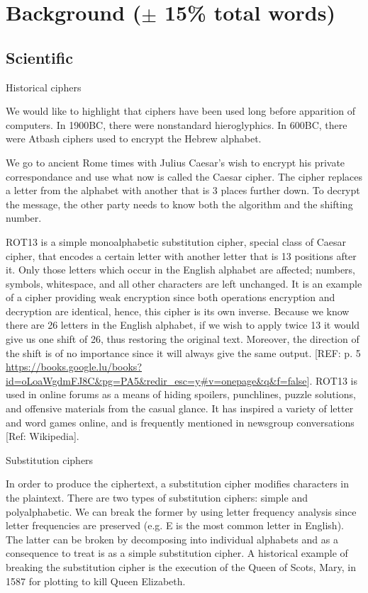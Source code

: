 \section{Background ($\pm$ 15\% total words)}
\subsection{Scientific}

Historical ciphers

We would like to highlight that ciphers have been used long before apparition of computers. In 1900BC, there were nonstandard hieroglyphics. In 600BC, there were Atbash ciphers used to encrypt the Hebrew alphabet. 

We go to ancient Rome times with Julius Caesar's wish to encrypt his private correspondance and use what now is called the Caesar cipher. The cipher replaces a letter from the alphabet with another that is 3 places further down. To decrypt the message, the other party needs to know both the algorithm and the shifting number. 

ROT13 is a simple monoalphabetic substitution cipher, special class of Caesar cipher, that encodes a certain letter with another letter that is 13 positions after it. Only those letters which occur in the English alphabet are affected; numbers, symbols, whitespace, and all other characters are left unchanged. It is an example of a cipher providing weak encryption since both operations encryption and decryption are identical, hence, this cipher is its own inverse.  Because we know there are 26 letters in the English alphabet, if we wish to apply twice 13 it would give us one shift of 26, thus restoring the original text. Moreover, the direction of the shift is of no importance since it will always give the same output. [REF: p. 5 \url{https://books.google.lu/books?id=oLoaWgdmFJ8C&pg=PA5&redir_esc=y#v=onepage&q&f=false}]. 
ROT13 is used in online forums as a means of hiding spoilers, punchlines, puzzle solutions, and offensive materials from the casual glance. It has inspired a variety of letter and word games online, and is frequently mentioned in newsgroup conversations [Ref: Wikipedia]. 

Substitution ciphers

In order to produce the ciphertext, a substitution cipher modifies characters in the plaintext. There are two types of substitution ciphers: simple and polyalphabetic. We can break the former by using letter frequency analysis since letter frequencies are preserved (e.g. E is the most common letter in English). The latter can be broken by decomposing into individual alphabets and as a consequence to treat is as a simple substitution cipher. A historical example of breaking the substitution cipher is the execution of the Queen of Scots, Mary, in 1587 for plotting to kill Queen Elizabeth.


